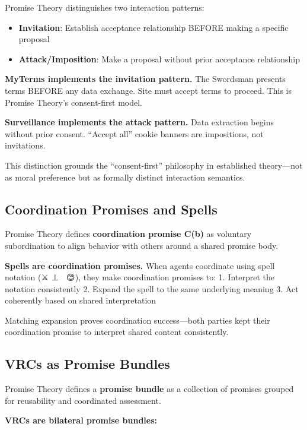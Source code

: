 \documentclass[
]{article}
\providecommand{\tightlist}{%
  \setlength{\itemsep}{0pt}\setlength{\parskip}{0pt}}
\begin{document}
Promise Theory distinguishes two interaction patterns:

\begin{itemize}
\tightlist
\item
  \textbf{Invitation}: Establish acceptance relationship BEFORE making a
  specific proposal
\item
  \textbf{Attack/Imposition}: Make a proposal without prior acceptance
  relationship
\end{itemize}

\textbf{MyTerms implements the invitation pattern.} The Swordsman
presents terms BEFORE any data exchange. Site must accept terms to
proceed. This is Promise Theory's consent-first model.

\textbf{Surveillance implements the attack pattern.} Data extraction
begins without prior consent. ``Accept all'' cookie banners are
impositions, not invitations.

This distinction grounds the ``consent-first'' philosophy in established
theory---not as moral preference but as formally distinct interaction
semantics.

\subsection{Coordination Promises and
Spells}\label{coordination-promises-and-spells}

Promise Theory defines \textbf{coordination promise C(b)} as voluntary
subordination to align behavior with others around a shared promise
body.

\textbf{Spells are coordination promises.} When agents coordinate using
spell notation (⚔️ ⊥ 🧙 \textbar{} 😊), they make coordination promises
to: 1. Interpret the notation consistently 2. Expand the spell to the
same underlying meaning 3. Act coherently based on shared interpretation

Matching expansion proves coordination success---both parties kept their
coordination promise to interpret shared content consistently.

\subsection{VRCs as Promise Bundles}\label{vrcs-as-promise-bundles}

Promise Theory defines a \textbf{promise bundle} as a collection of
promises grouped for reusability and coordinated assessment.

\textbf{VRCs are bilateral promise bundles:}
\end{document}
